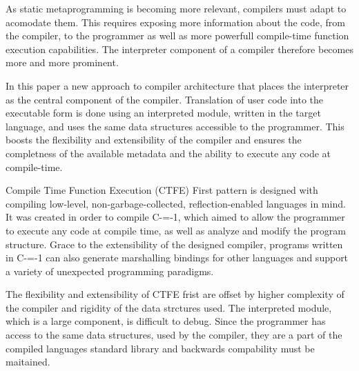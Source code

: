 As static metaprogramming is becoming more relevant, compilers must adapt to acomodate them.
This requires exposing more information about the code, from the compiler, to the programmer as well as more powerfull compile-time function execution capabilities.
The interpreter component of a compiler therefore becomes more and more prominent.

In this paper a new approach to compiler architecture that places the interpreter as the central component of the compiler.
Translation of user code into the executable form is done using an interpreted module, written in the target language, and uses the same data structures accessible to the programmer.
This boosts the flexibility and extensibility of the compiler and ensures the completness of the available metadata and the ability to execute any code at compile-time.

Compile Time Function Execution (CTFE) First pattern is designed with compiling low-level, non-garbage-collected, reflection-enabled languages in mind.
It was created in order to compile C-=-1, which aimed to allow the programmer to execute any code at compile time, as well as analyze and modify the program structure.
Grace to the extensibility of the designed compiler, programs written in C-=-1 can also generate marshalling bindings for other languages and support a variety of unexpected programming paradigms.

The flexibility and extensibility of CTFE frist are offset by higher complexity of the compiler and rigidity of the data strctures used.
The interpreted module, which is a large component, is difficult to debug.
Since the programmer has access to the same data structures, used by the compiler, they are a part of the compiled languages standard library and backwards compability must be maitained.
